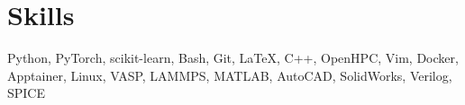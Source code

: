 \section{Skills}
Python, PyTorch, scikit-learn, Bash, Git, \LaTeX, C++, OpenHPC, Vim, Docker, Apptainer, Linux, VASP, LAMMPS, MATLAB, AutoCAD, SolidWorks, Verilog, SPICE
